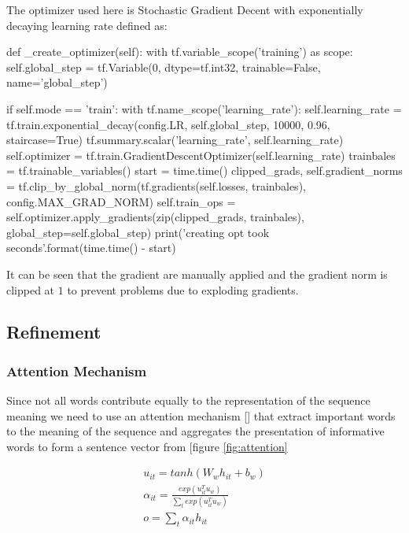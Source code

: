 \documentclass{article}
\begin{document}
    The optimizer used here is Stochastic Gradient Decent with exponentially decaying learning rate defined as:

    \begin{python}
    def _create_optimizer(self):
    with tf.variable_scope('training') as scope:
        self.global_step = tf.Variable(0, dtype=tf.int32, trainable=False,
                                        name='global_step')

        if self.mode == 'train':
            with tf.name_scope('learning_rate'):
                self.learning_rate = tf.train.exponential_decay(config.LR, self.global_step,
                                        10000, 0.96, staircase=True)
                tf.summary.scalar('learning_rate', self.learning_rate)
            self.optimizer = tf.train.GradientDescentOptimizer(self.learning_rate)
            trainbales = tf.trainable_variables()
            start = time.time()
            clipped_grads, self.gradient_norms = tf.clip_by_global_norm(tf.gradients(self.losses,
            trainbales), config.MAX_GRAD_NORM)
            self.train_ops = self.optimizer.apply_gradients(zip(clipped_grads, trainbales),
            global_step=self.global_step)
            print('creating opt took {} seconds'.format(time.time() - start)
    \end{python}

    It can be seen that the gradient are manually applied and the gradient norm is clipped at $1$ to prevent problems due to exploding gradients.

    \subsection{Refinement}

    \subsubsection{Attention Mechanism}
    Since not all words contribute equally to the representation of the sequence meaning we need to use an attention mechanism [\cite{yang2016hierarchical}] that extract important words to the meaning of the sequence and aggregates the presentation of informative words to form a sentence vector from [figure \ref{fig:attention}

    \begin{align}
        u_{it} = tanh(W_w h_{it} + b_w) \\
        \alpha_{it} = \frac{exp(u_{it}^T u_w)}{\sum_t exp(u_{it}^T u_w)} \\
        o = \sum_t \alpha_{it}h_{it}
    \end{align}
\end{document}
